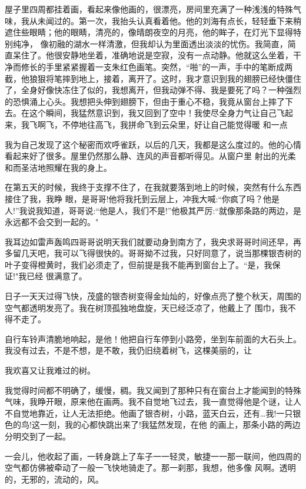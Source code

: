 \documentclass{article}
\begin{document}
屋子里四周都挂着画，看起来像他画的，很漂亮，房间里充满了一种浅浅的特殊气味，我从未闻过的。第一次，我抬头认真看着他。他的刘海有点长，轻轻垂下来稍遮住些眼睛；他的眼睛，清亮的，像晴朗夜空的月亮，他的眸子，在灯光下显得特别纯净，
\newpage
像初融的湖水一样清激，但我却认为里面透出淡淡的忧伤。我简直，简直呆住了。他很安静地坐着，准确地说是空寂，没有一点动静。他就这么坐着，干净而修长的手里紧紧握着一支朱红色画笔。突然，“啪”的一声，手中的笔断成两截，他狼狠将笔摔到地上，接着，离开了。这时，我才意识到我的翅膀已经快僵住了，全身好像快冻住了似的，我想离开，但我动弹不得、我是要死了吗？一种强烈的恐惧涌上心头。我想把头伸到翅膀下，但由于重心不稳，我竟从窗台上摔了下去。在这个瞬间，我猛然意识到，我又回到了空中！我使尽全身力气让自己飞起来，我飞啊飞，不停地往高飞，我拼命飞到云朵里，好让自己能觉得暖
和一点 

我为自己发现了这个秘密而欢呼雀跃，以后的几天，我都是这么度过的。他的心情看起来好了很多。屋里仍然那么静、连风的声音都听得见。从窗户里
射出的光柔和而圣洁地照耀在我的身上。 

在第五天的时候，我终于支撑不住了，在我就要落到地上的时候，突然有什么东西接住了我，我睁
\newpage
眼，是哥哥!他将我托到云层上，冲我大喊:“你疯了吗？他是人!”我说我知道，哥哥说:“他是人，我们不是!”他极其严厉:“就像那条路的两边，是
永远都不会交到一起的。" 

我耳边如雷声轰鸣四哥哥说明天我们就要动身到南方了，我央求哥哥时间还早，再多留几天吧，我可以飞得很快的。哥哥拗不过我，只好同意了，说当那棵银杏树的叶子变得橙黄时，我们必须走了，但前提是我不能再到窗台上了。“是，我保证!"我已经
很满意了。 

日子一天天过得飞快，茂盛的银杏树变得金灿灿的，好像点亮了整个秋天，周围的空气都透明发亮了。我在树顶孤独地盘旋，天已经泛凉了，他戴上了
围巾，我不得不走了。 

自行车铃声清脆地响起，是他！他把自行车停到小路旁，坐到车前面的大石头上。我没有过去，不是不想，是不敢，我仍旧绕着树飞，这棵美丽的，让

\newpage
我欢喜又让我难过的树。 

我觉得时间都不明确了，缓慢，稠。我又闻到了那种只有在窗台上才能闻到的特殊气味，我睁开眼，原来他在画两。我不自觉地飞过去，我一直觉得他是个谜，让人不自觉地靠近，让人无法拒绝。他画了银杏树，小路，蓝天白云，还有…我!一只银色的鸟!这一刻，我的心都快跳出来了!我猛然发现，在他
的画上，那条小路的两边分明交到了一起。 

一会儿，他收起了画，一转身跳上了车子一一轻灵，敏捷一一那一联间，他四周的空气都仿佛被牵动了一般一飞快地骑走了。那一刹那，我想，他多像
风啊。透明的，无邪的，流动的，风。 
\end{document}
